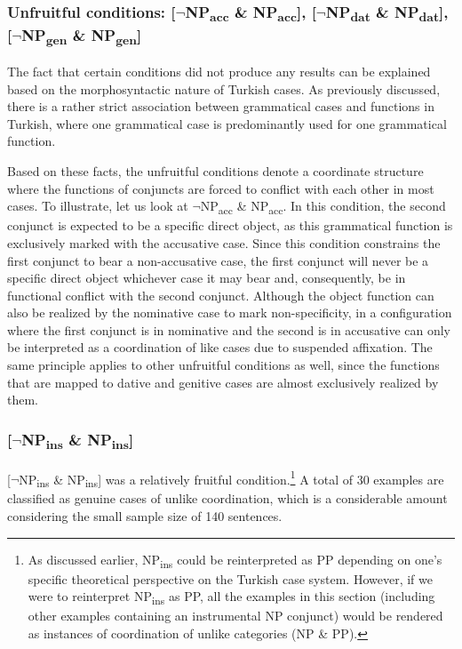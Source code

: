 \subsubsection{Unfruitful conditions: [$\neg$NP\textsubscript{acc} \& NP\textsubscript{acc}], [$\neg$NP\textsubscript{dat} \& NP\textsubscript{dat}], [$\neg$NP\textsubscript{gen} \& NP\textsubscript{gen}]}

The fact that certain conditions did not produce any results can be explained based on the morphosyntactic nature of Turkish cases. As previously discussed, there is a rather strict association between grammatical cases and functions in Turkish, where one grammatical case is predominantly used for one grammatical function.

Based on these facts, the unfruitful conditions denote a coordinate structure where the functions of conjuncts are forced to conflict with each other in most cases. To illustrate, let us look at $\neg$NP\textsubscript{acc} \& NP\textsubscript{acc}. In this condition, the second conjunct is expected to be a specific direct object, as this grammatical function is exclusively marked with the accusative case. Since this condition constrains the first conjunct to bear a non-accusative case, the first conjunct will never be a specific direct object whichever case it may bear and, consequently, be in functional conflict with the second conjunct. Although the object function can also be realized by the nominative case to mark non-specificity, in a configuration where the first conjunct is in nominative and the second is in accusative can only be interpreted as a coordination of like cases due to suspended affixation. The same principle applies to other unfruitful conditions as well, since the functions that are mapped to dative and genitive cases are almost exclusively realized by them. 

\subsubsection{[$\neg$NP\textsubscript{ins} \& NP\textsubscript{ins}]}

\begin{sloppypar}
[$\neg$NP\textsubscript{ins} \& NP\textsubscript{ins}] was a relatively fruitful condition.\footnote{As discussed earlier,  NP\textsubscript{ins} could be reinterpreted as PP depending on one's specific theoretical perspective on the Turkish case system. However, if we were to reinterpret NP\textsubscript{ins} as PP, all the examples in this section (including other examples containing an instrumental NP conjunct) would be rendered as instances of coordination of unlike categories (NP \& PP).} A total of 30 examples are classified as genuine cases of unlike coordination, which is a considerable amount considering the small sample size of 140 sentences.
\end{sloppypar}

